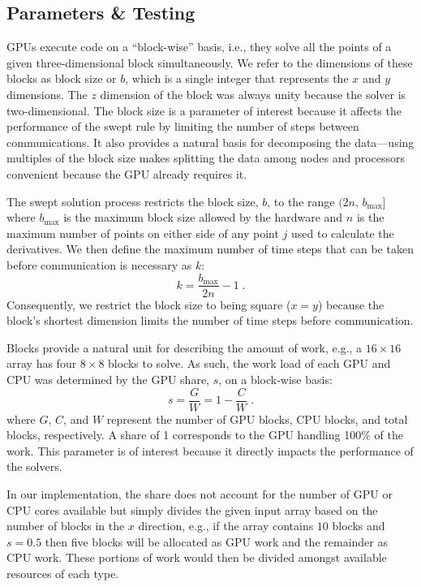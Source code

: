 \documentclass[mca,article,submit,moreauthors,pdftex]{Definitions/mdpi}
\begin{document}
\subsection{Parameters \& Testing}
\label{parameters-section}

GPUs execute code on a ``block-wise'' basis, i.e., they solve all the points of a given three-dimensional block simultaneously. We refer to the dimensions of these blocks as block size or $b$, which is a single integer that represents the $x$ and $y$ dimensions. 
The $z$ dimension of the block was always unity because the solver is two-dimensional. The block size is a parameter of interest because it affects the performance of the swept rule by limiting the number of steps between communications. 
It also provides a natural basis for decomposing the data---using multiples of the block size makes splitting the data among nodes and processors convenient because the GPU already requires it.

The swept solution process restricts the block size, $b$, to the range $(2n,\,b_{\max}]$ where $b_{\max}$ is the maximum block size allowed by the hardware and $n$ is the maximum number of points on either side of any point $j$ used to calculate the derivatives. We then define the maximum number of time steps that can be taken before communication is necessary as $k$:
\begin{equation}
    \label{blocksize-equation}
    k = \frac{b_{\max}}{2n}-1 \;.
\end{equation}
Consequently, we restrict the block size to being square ($x=y$) because the block's shortest dimension limits the number of time steps before communication. 

Blocks provide a natural unit for describing the amount of work, e.g., a $16\times16$ array has four $8\times8$ blocks to solve. As such, the work load of each GPU and CPU was determined by the GPU share, $s$, on a block-wise basis:  
\begin{equation}
    \label{share-equation}
    s = \frac{G}{W} = 1-\frac{C}{W} \;.
\end{equation}
where $G$, $C$, and $W$ represent the number of GPU blocks, CPU blocks, and total blocks, respectively. 
A share of 1 corresponds to the GPU handling 100\% of the work.
This parameter is of interest because it directly impacts the performance of the solvers.

In our implementation, the share does not account for the number of GPU or CPU cores available but simply divides the given input array based on the number of blocks in the $x$ direction, e.g., if the array contains $10$ blocks and $s=0.5$ then five blocks will be allocated as GPU work and the remainder as CPU work. These portions of work would then be divided amongst available resources of each type. 
\end{document}
